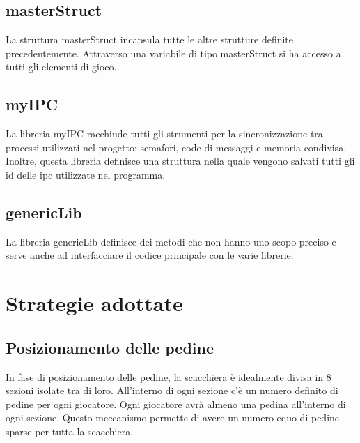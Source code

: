 \documentclass{article}
\begin{document}
\subsection{masterStruct}
La struttura masterStruct incapsula tutte le altre strutture definite precedentemente. Attraverso una variabile di tipo masterStruct si ha accesso a tutti gli elementi di gioco. 

\subsection{myIPC}
La libreria myIPC racchiude tutti gli strumenti per la sincronizzazione tra processi utilizzati nel progetto: semafori, code di messaggi e memoria condivisa. Inoltre, questa libreria definisce una struttura nella quale vengono salvati tutti gli id delle ipc utilizzate nel programma.

\subsection{genericLib}
La libreria genericLib definisce dei metodi che non hanno uno scopo preciso e serve anche ad interfacciare il codice principale con le varie librerie.
\section{Strategie adottate}

\subsection{Posizionamento delle pedine}
In fase di posizionamento delle pedine, la scacchiera è idealmente divisa in 8 sezioni isolate tra di loro. All'interno di ogni sezione c'è un numero definito di pedine per ogni giocatore. Ogni giocatore avrà almeno una pedina all'interno di ogni sezione. \newline Questo meccanismo permette di avere un numero equo di pedine sparse per tutta la scacchiera.
\end{document}
